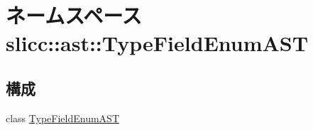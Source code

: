 \hypertarget{namespaceslicc_1_1ast_1_1TypeFieldEnumAST}{
\section{ネームスペース slicc::ast::TypeFieldEnumAST}
\label{namespaceslicc_1_1ast_1_1TypeFieldEnumAST}
}
\subsection*{構成}
\begin{DoxyCompactItemize}
\item 
class \hyperlink{classslicc_1_1ast_1_1TypeFieldEnumAST_1_1TypeFieldEnumAST}{TypeFieldEnumAST}
\end{DoxyCompactItemize}
